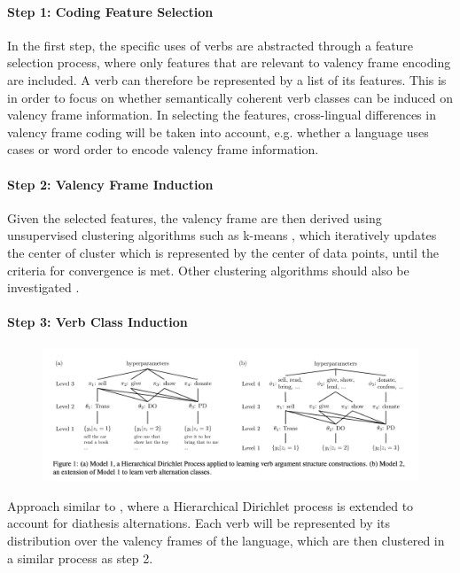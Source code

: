 \paragraph{\textbf{Step 1: Coding Feature Selection}}
In the first step, the specific uses of verbs are abstracted through a feature selection process, where only features that are relevant to valency frame encoding are included. A verb can therefore be represented by a list of its features. This is in order to focus on whether semantically coherent verb classes can be induced on valency frame information. In selecting the features, cross-lingual differences in valency frame coding will be taken into account, e.g. whether a language uses cases or word order to encode valency frame information. 

\paragraph{\textbf{Step 2: Valency Frame Induction}}
Given the selected features, the valency frame are then derived using unsupervised clustering algorithms such as k-means \citep{macqueen1967}, which iteratively updates the center of cluster which is represented by the center of data points, until the criteria for convergence is met. Other clustering algorithms should also be investigated \citep{xu2015a}. 

\paragraph{\textbf{Step 3: Verb Class Induction}}

\begin{figure}
    \includegraphics[width=\textwidth]{figures/verb_alternation_classes.png}
    \centering    
\end{figure}

Approach similar to \citet{parisien2010}, where a Hierarchical Dirichlet process is extended to account for diathesis alternations. Each verb will be represented by its distribution over the valency frames of the language, which are then clustered in a similar process as step 2.


